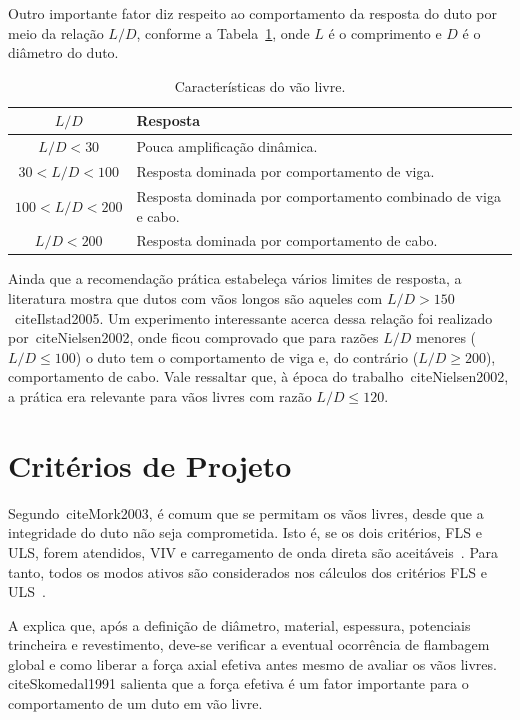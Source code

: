 Outro importante fator diz respeito ao comportamento da resposta do duto por meio da relação $L/D$, conforme a Tabela~\ref{tab:viv-caracvao}, onde $L$ é o comprimento e $D$ é o diâmetro do duto.

\begin{table}[ht!]
	\renewcommand{\arraystretch}{1.2}
 	\small
 	\centering
 	\caption{Características do vão livre.}
 	\label{tab:viv-caracvao}
 	\begin{tabular}{cl}
	 	\toprule
	 	$L/D$             & Resposta\\
	 	\midrule
	 	$L/D < 30$        & Pouca amplificação dinâmica. \\
	 	$30 < L/D < 100$  & Resposta dominada por comportamento de viga. \\
	 	$100 < L/D < 200$ & Resposta dominada por comportamento combinado de viga e cabo. \\
	 	$L/D < 200$       & Resposta dominada por comportamento de cabo. \\
	 	\bottomrule
 	\end{tabular}
\end{table}

Ainda que a recomendação prática estabeleça vários limites de resposta, a literatura mostra que dutos com vãos longos são aqueles com $L/D > 150$~cite{Ilstad2005}.
Um experimento interessante acerca dessa relação foi realizado por~cite{Nielsen2002}, onde ficou comprovado que para razões $L/D$ menores ($L/D \leq 100$) o duto tem o comportamento de viga e, do contrário ($L/D \geq 200$), comportamento de cabo.
Vale ressaltar que, à época do trabalho~cite{Nielsen2002}, a prática era relevante para vãos livres com razão $L/D \leq 120$.

\section{Critérios de Projeto}

Segundo~cite{Mork2003}, é comum que se permitam os vãos livres, desde que a integridade do duto não seja comprometida.
Isto é, se os dois critérios, FLS e ULS, forem atendidos, VIV e carregamento de onda direta são aceitáveis~\cite{DNV2017}.
Para tanto, todos os modos ativos são considerados nos cálculos dos critérios FLS e ULS~\cite{Mork2003}.

A  explica que, após a definição de diâmetro, material, espessura, potenciais trincheira e revestimento, deve-se verificar a eventual ocorrência de flambagem global e como liberar a força axial efetiva antes mesmo de avaliar os vãos livres.
cite{Skomedal1991} salienta que a força efetiva é um fator importante para o comportamento de um duto em vão livre.

